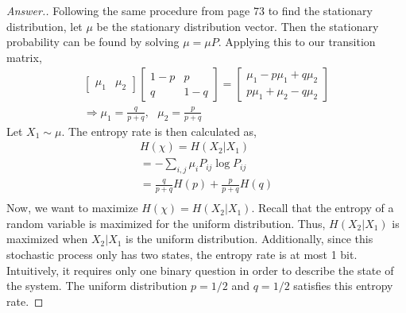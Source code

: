 \documentclass[10pt,twoside]{article}
\begin{document}
\begin{itemize}
    \begin{proof}[Answer.]
    Following the same procedure from page $73$ to find the stationary distribution, let $\mu$ be the stationary distribution vector. Then the stationary probability can be found by solving $\mu = \mu P$. Applying this to our transition matrix,
    \begin{gather*}
        \begin{bmatrix}
            \mu_1 & \mu_2
        \end{bmatrix}
        \begin{bmatrix}
            1 - p  & p \\
            q & 1-q
        \end{bmatrix} = 
        \begin{bmatrix}
            \mu_1 - p\mu_1 + q\mu_2 \\
            p\mu_1 + \mu_2 - q\mu_2
        \end{bmatrix} \\
        \Rightarrow
        \mu_1 = \frac{q}{p+q},\hspace{8pt}
        \mu_2 = \frac{p}{p+q}
    \end{gather*}
    Let $X_1\sim \mu$. The entropy rate is then calculated as,
    \begin{gather*}
        H(\chi) = H(X_2|X_1) \\
        = - \sum_{i, j}\mu_i P_{ij}\log P_{ij} \\
        = \frac{q}{p+q}H(p) + \frac{p}{p+q}H(q) \\
    \end{gather*}
    Now, we want to maximize $H(\chi) = H(X_2|X_1)$. Recall that the entropy of a random variable is maximized for the uniform distribution. Thus, $H(X_2|X_1)$ is maximized when $X_2|X_1$ is the uniform distribution. Additionally, since this stochastic process only has two states, the entropy rate is at most 1 bit. Intuitively, it requires only one binary question in order to describe the state of the system. The uniform distribution $p=1/2$ and $q=1/2$ satisfies this entropy rate.
    
    \end{proof}

\newpage
    

\end{itemize}
\end{document}
